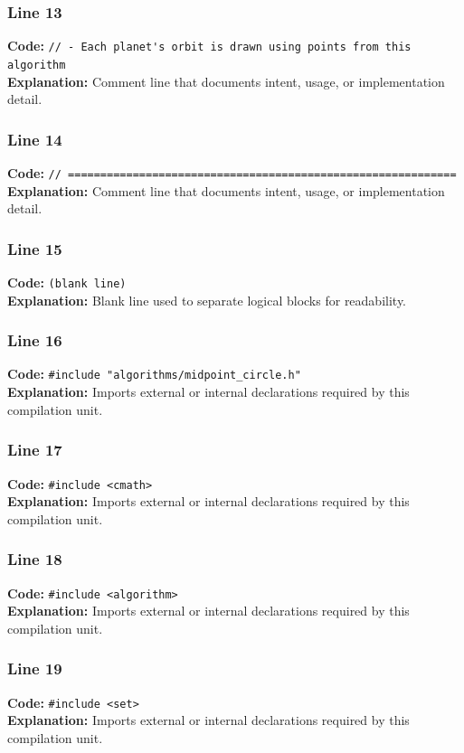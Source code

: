 \documentclass[11pt,a4paper]{article}
\begin{document}
\subsubsection*{Line 13}
\textbf{Code:} \verb|// - Each planet's orbit is drawn using points from this algorithm|\\
\textbf{Explanation:} Comment line that documents intent, usage, or implementation detail.

\subsubsection*{Line 14}
\textbf{Code:} \verb|// ============================================================|\\
\textbf{Explanation:} Comment line that documents intent, usage, or implementation detail.

\subsubsection*{Line 15}
\textbf{Code:} \texttt{(blank line)}\\
\textbf{Explanation:} Blank line used to separate logical blocks for readability.

\subsubsection*{Line 16}
\textbf{Code:} \verb|#include "algorithms/midpoint_circle.h"|\\
\textbf{Explanation:} Imports external or internal declarations required by this compilation unit.

\subsubsection*{Line 17}
\textbf{Code:} \verb|#include <cmath>|\\
\textbf{Explanation:} Imports external or internal declarations required by this compilation unit.

\subsubsection*{Line 18}
\textbf{Code:} \verb|#include <algorithm>|\\
\textbf{Explanation:} Imports external or internal declarations required by this compilation unit.

\subsubsection*{Line 19}
\textbf{Code:} \verb|#include <set>|\\
\textbf{Explanation:} Imports external or internal declarations required by this compilation unit.
\end{document}
